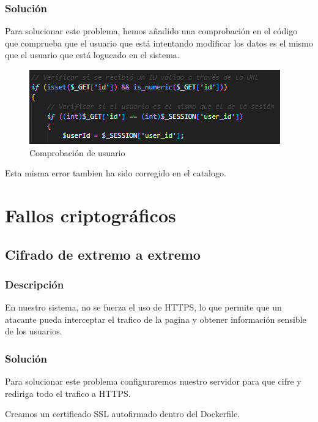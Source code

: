 \documentclass{report}
\begin{document}
                \subsubsection{Solución}
                    Para solucionar este problema, hemos añadido una comprobación en el código que comprueba que el usuario que está intentando modificar los datos es el mismo que el usuario que está logueado en el sistema.
                    \begin{figure}[H]
                        \centering
                        \includegraphics[width=\textwidth]{./img/vulnerabilidades/3.1.1.4.png}
                        \caption{Comprobación de usuario}
                    \end{figure}
                    Esta misma error tambien ha sido corregido en el catalogo.
            \clearpage       
        \section{Fallos criptográficos}
            \subsection{Cifrado de extremo a extremo}
                \subsubsection{Descripción}
                    En nuestro sistema, no se fuerza el uso de HTTPS, lo que permite que un atacante pueda interceptar el trafico de la pagina y obtener información sensible de los usuarios.
                \subsubsection{Solución}
                    Para solucionar este problema configuraremos nuestro servidor para que cifre y rediriga todo el trafico a HTTPS.
                    
                    Creamos un certificado SSL autofirmado dentro del Dockerfile.
                    
\end{document}
